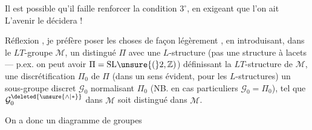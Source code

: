 
Il est possible qu'il faille renforcer la condition \(3^\circ\), en exigeant que l'on ait
L'avenir le décidera !


Réflexion , je préfère poser les choses de façon légèrement , en introduisant, dans le \(LT\)-groupe  \(\mathcal{M}\), un   distingué \(\Pi\) avec une \(L\)-structure (pas  une structure à lacets --- p.ex. on peut avoir \(\Pi=\mathrm{SL}\unsure{(}2,\mathbb{Z})\)) définissant la \(LT\)-structure de \(\mathcal{M}\), une discrétification \(\Pi_0\) de \(\Pi\) (dans un sens évident, pour les \(L\)-structures) un sous-groupe discret \(\mathcal{G}_0\)  normalisant \(\Pi_0\) (NB. en cas particuliers   \(\mathcal{G}_0=\Pi_0\)), tel que  \(\mathcal{G}_0^{\deleted{\unsure{\wedge|*}}}\)  dans \(\mathcal{M}\) soit distingué dans \(\mathcal{M}\).

On a donc un diagramme de groupes


